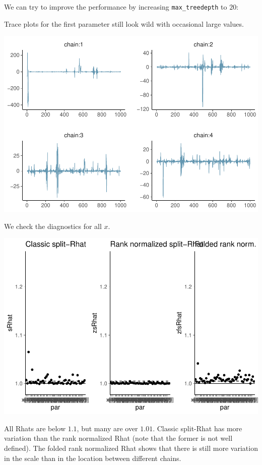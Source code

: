 \documentclass[american,]{article}
\begin{document}
We can try to improve the performance by increasing
\texttt{max\_treedepth} to \(20\):

Trace plots for the first parameter still look wild with occasional
large values.

\includegraphics{graphics/trace-fit-nom-td20-1.pdf}

We check the diagnostics for all \(x\).

\includegraphics{graphics/rhat-fit-nom-td20-1.pdf}

All Rhats are below \(1.1\), but many are over \(1.01\). Classic
split-Rhat has more variation than the rank normalized Rhat (note that
the former is not well defined). The folded rank normalized Rhat shows
that there is still more variation in the scale than in the location
between different chains.
\end{document}
